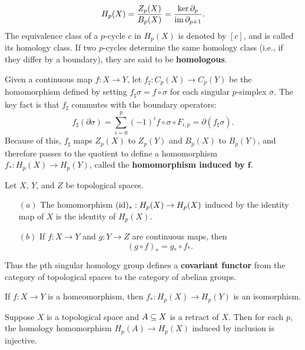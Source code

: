 \[H_p(X)=\dfrac{Z_p(X)}{B_p(X)}=\dfrac{\mathrm{ker}\,\partial_p}{\mathrm{im}\,\partial_{p+1}}.\]
The equivalence class of a $p$-cycle $c$ in $H_p(X)$ is denoted by $[c]$, and is called its homology class. If two $p$-cycles determine the same homology class (i.e., if they differ by a boundary), they are said to be \textbf{homologous}.\par
Given a continuous map $f:X\to Y$, let $f_{\sharp}:C_p(X)\to C_p(Y)$ be the homomorphism defined by setting $f_{\sharp}\sigma=f\circ\sigma$ for each singular $p$-simplex $\sigma$. The key fact is that $f_{\sharp}$ commutes with the boundary operators:
\[f_{\sharp}(\partial\sigma)=\sum_{i=0}^{p}(-1)^if\circ\sigma\circ F_{i,p}=\partial(f_{\sharp}\sigma).\]
Because of this, $f_\sharp$ maps $Z_p(X)$ to $Z_p(Y)$ and $B_p(X)$ to $B_p(Y)$, and therefore passes to the quotient to define a homomorphism $f_{*}:H_p(X)\to H_p(Y)$, 
called the \textbf{homomorphism induced by $\bm{f}$}.
\begin{proposition}
Let $X$, $Y$, and $Z$ be topological spaces.
\begin{itemize}
\item[$(a)$]The homomorphism $(\mathrm{id})_*:H_p(X)\to H_p(X)$ induced by the identity map of $X$ is the identity of $H_p(X)$.
\item[$(b)$]If $f:X\to Y$ and $g:Y\to Z$ are continuous maps, then
\[(g\circ f)_*=g_*\circ f_*.\]
\end{itemize}
Thus the pth singular homology group defines a \textbf{covariant functor} from the category of topological spaces to the category of abelian groups.
\end{proposition}
\begin{corollary}
If $f:X\to Y$ is a homeomorphism, then $f_*:H_p(X)\to H_p(Y)$ is an isomorphism.
\end{corollary}
\begin{corollary}
Suppose $X$ is a topological space and $A\subseteq X$ is a retract of $X$. Then for each $p$, the homology homomorphism $H_p(A)\to H_p(X)$ induced by inclusion is injective.
\end{corollary}
